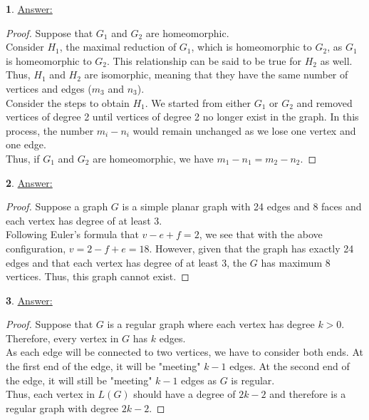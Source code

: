 \documentclass[12pt,a4paper]{article}
\theoremstyle{definition}
\newtheorem{problem}{}
\begin{document}
\begin{problem} \underline{Answer:}
\begin{proof}
Suppose that $G_1$ and $G_2$ are homeomorphic.  \\

Consider $H_1$, the maximal reduction of $G_1$, which is homeomorphic to $G_2$, as $G_1$ is homeomorphic to $G_2$. This relationship can be said to be true for $H_2$ as well. Thus, $H_1$ and $H_2$ are isomorphic, meaning that they have the same number of vertices and edges ($m_3$ and $n_3$). \\

Consider the steps to obtain $H_1$. We started from either $G_1$ or $G_2$ and removed vertices of degree 2 until vertices of degree 2 no longer exist in the graph. In this process, the number $m_i - n_i$ would remain unchanged as we lose one vertex and one edge. \\

Thus, if $G_1$ and $G_2$ are homeomorphic, we have $m_1 - n_1 = m_2 - n_2$.
\end{proof}
\end{problem}

\begin{problem} \underline{Answer:}
\begin{proof}
Suppose a graph $G$ is a simple planar graph with 24 edges and 8 faces and each vertex has degree of at least 3.\\

Following Euler's formula that $v - e + f = 2$, we see that with the above configuration, $v = 2 - f + e = 18$. However, given that the graph has exactly 24 edges and that each vertex has degree of at least 3, the $G$ has maximum 8 vertices. Thus, this graph cannot exist.
\end{proof}
\end{problem}

\begin{problem} \underline{Answer:}
\begin{proof}
Suppose that $G$ is a regular graph where each vertex has degree $k > 0$. Therefore, every vertex in $G$ has $k$ edges. \\

As each edge will be connected to two vertices, we have to consider both ends. At the first end of the edge, it will be "meeting" $k - 1$ edges. At the second end of the edge, it will still be "meeting" $k - 1$ edges as $G$ is regular. \\

Thus, each vertex in $L(G)$ should have a degree of $2k - 2$ and therefore is a regular graph with degree $2k - 2$.
\end{proof}
\end{problem}
\end{document}
